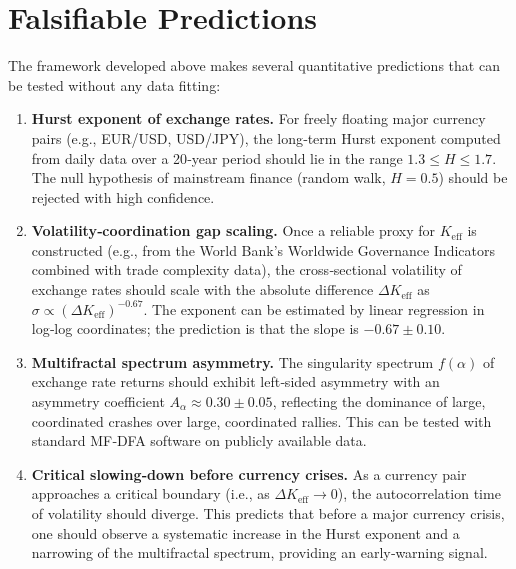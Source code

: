 \documentclass[12pt,a4paper]{article}
\theoremstyle{remark}
\begin{document}
	\section{Falsifiable Predictions}
	
	The framework developed above makes several quantitative predictions that can be tested without any data fitting:
	
	\begin{enumerate}[label=(\arabic*)]
		\item \textbf{Hurst exponent of exchange rates.} For freely floating major currency pairs (e.g., EUR/USD, USD/JPY), the long‑term Hurst exponent computed from daily data over a 20‑year period should lie in the range \(1.3 \le H \le 1.7\). The null hypothesis of mainstream finance (random walk, \(H = 0.5\)) should be rejected with high confidence.
		
		\item \textbf{Volatility‑coordination gap scaling.} Once a reliable proxy for \(K_{\mathrm{eff}}\) is constructed (e.g., from the World Bank's Worldwide Governance Indicators combined with trade complexity data), the cross‑sectional volatility of exchange rates should scale with the absolute difference \(\Delta K_{\mathrm{eff}}\) as \(\sigma \propto (\Delta K_{\mathrm{eff}})^{-0.67}\). The exponent can be estimated by linear regression in log‑log coordinates; the prediction is that the slope is \(-0.67 \pm 0.10\).
		
		\item \textbf{Multifractal spectrum asymmetry.} The singularity spectrum \(f(\alpha)\) of exchange rate returns should exhibit left‑sided asymmetry with an asymmetry coefficient \(A_\alpha \approx 0.30 \pm 0.05\), reflecting the dominance of large, coordinated crashes over large, coordinated rallies. This can be tested with standard MF‑DFA software on publicly available data.
		
		\item \textbf{Critical slowing‑down before currency crises.} As a currency pair approaches a critical boundary (i.e., as \(\Delta K_{\mathrm{eff}} \to 0\)), the autocorrelation time of volatility should diverge. This predicts that before a major currency crisis, one should observe a systematic increase in the Hurst exponent and a narrowing of the multifractal spectrum, providing an early‑warning signal.
	\end{enumerate}
	
\end{document}
